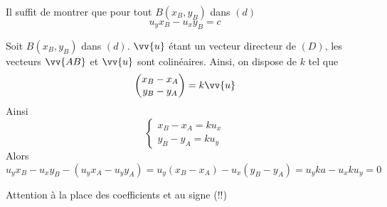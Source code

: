 \begin{preuve}
Il suffit de montrer que pour tout $B(x_B,y_B)$ dans $(d)$ $$u_yx_B - u_xy_B = c$$\newline

Soit $B(x_B,y_B)$ dans $(d)$. $\vv{u}$ étant un vecteur directeur de $(D)$, les vecteurs $\vv{AB}$ et $\vv{u}$ sont colinéaires. Ainsi, on dispose de $k$ tel que $$\covec{x_B-x_A}{y_B-y_A} = k\vv{u}$$
Ainsi 
$$\left\{ \begin{array}{l} x_B-x_A = ku_x \\ y_B - y_A = ku_y\end{array} \right.$$
Alors 
$$u_yx_B - u_xy_B - (u_yx_A - u_yy_A) = u_y(x_B-x_A) - u_x(y_B - y_A) = u_yka-u_xku_y = 0$$
\end{preuve}
Attention à la place des coefficients et au signe (!!)\newline

\newline

\newline

